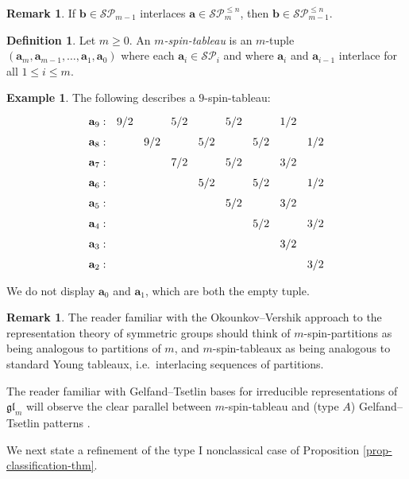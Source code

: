\documentclass[10pt]{amsart}
\numberwithin{equation}{section}
\theoremstyle{definition}
\newtheorem{rem}[thm]{Remark}
\newtheorem{defn}[thm]{Definition}
\newtheorem{example}[thm]{Example}
\newcommand{\glm}{\mathfrak{gl}_{m}}
\newcommand{\ab}{\mathbf{a}}
\newcommand{\abb}{\mathbf{b}}
\newcommand{\SP}{\mathcal{SP}}
\begin{document}
\begin{rem}\label{rem:interlacesaturated}
If $\abb\in \SP_{m-1}$ interlaces $\ab\in \SP_{m}^{\le n}$, then $\abb\in \SP_{m-1}^{\le n}$. 
\end{rem}

\begin{defn} 
Let $m \ge 0$. 
An \emph{$m$-spin-tableau} is an $m$-tuple 
$(\ab_m,\ab_{m-1}, \ldots, \ab_1, \ab_0)$
where each $\ab_i\in \SP_i$ and where $\ab_i$ and $\ab_{i-1}$ interlace for all $1 \le i \le m$.
\end{defn}

\begin{example}\label{ex:spintable}
The following describes a $9$-spin-tableau:
\[
\begin{tikzcd}[column sep = 0.1 em, row sep =0.1 em]
\ab_9: & 9/2 & & 5/2 & & 5/2 & & 1/2 &  \\
\ab_8: &  & 9/2 & & 5/2 & & 5/2 & & 1/2 \\
\ab_7: &  & & 7/2 & & 5/2 & & 3/2 &  \\
\ab_6: &  & & & 5/2 & & 5/2 & & 1/2 \\
\ab_5: &  & & & & 5/2 & & 3/2 &  \\
\ab_4: &  & & & & & 5/2 & & 3/2 \\
\ab_3: &  & & & & & & 3/2 &  \\
\ab_2: &  & & & & & & & 3/2 \\
	\end{tikzcd}
	\]
We do not display $\ab_0$ and $\ab_1$, which are both the empty tuple.
	\end{example}

\begin{rem} 
The reader familiar with the Okounkov--Vershik \cite{MR1443185} approach to the
representation theory of symmetric groups 
should think of $m$-spin-partitions as being analogous to partitions of $m$, 
and $m$-spin-tableaux as being analogous to standard Young tableaux, 
i.e.~interlacing sequences of partitions.

The reader familiar with Gelfand--Tsetlin bases for irreducible representations of $\glm$ will observe the 
clear parallel between $m$-spin-tableau and (type $A$) Gelfand--Tsetlin patterns \cite{GelfandCetlin}.
\end{rem}

We next state a refinement of the type I nonclassical case of Proposition \ref{prop-classification-thm}.
\end{document}
